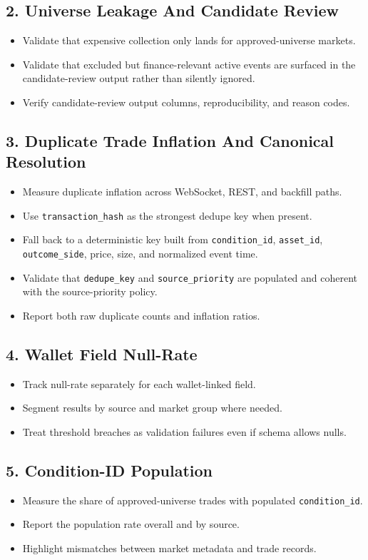 \documentclass{article}
\begin{document}
\subsection*{2. Universe Leakage And Candidate Review}
\begin{itemize}
\item Validate that expensive collection only lands for approved-universe
markets.
\item Validate that excluded but finance-relevant active events are surfaced in
the candidate-review output rather than silently ignored.
\item Verify candidate-review output columns, reproducibility, and reason codes.
\end{itemize}

\subsection*{3. Duplicate Trade Inflation And Canonical Resolution}
\begin{itemize}
\item Measure duplicate inflation across WebSocket, REST, and backfill paths.
\item Use \texttt{transaction\_hash} as the strongest dedupe key when present.
\item Fall back to a deterministic key built from \texttt{condition\_id},
\texttt{asset\_id}, \texttt{outcome\_side}, price, size, and normalized event
time.
\item Validate that \texttt{dedupe\_key} and \texttt{source\_priority} are
populated and coherent with the source-priority policy.
\item Report both raw duplicate counts and inflation ratios.
\end{itemize}

\subsection*{4. Wallet Field Null-Rate}
\begin{itemize}
\item Track null-rate separately for each wallet-linked field.
\item Segment results by source and market group where needed.
\item Treat threshold breaches as validation failures even if schema allows
nulls.
\end{itemize}

\subsection*{5. Condition-ID Population}
\begin{itemize}
\item Measure the share of approved-universe trades with populated
\texttt{condition\_id}.
\item Report the population rate overall and by source.
\item Highlight mismatches between market metadata and trade records.
\end{itemize}
\end{document}
